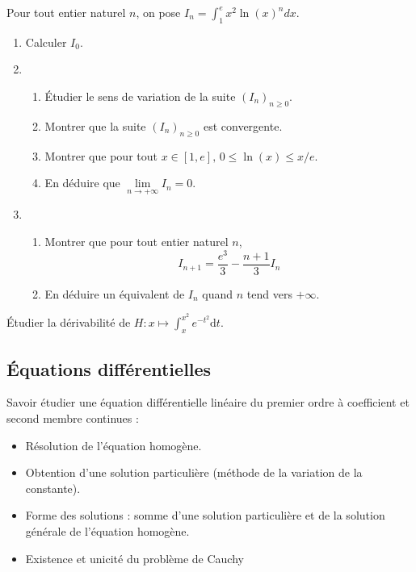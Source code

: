 \documentclass[a4paper,twoside,french,10pt]{VcCours}
\newcommand{\dt}{\text{d}t}
\begin{document}
\medskip

\begin{Exercice}{}\end{Exercice} Pour tout entier naturel $n$, on pose $I_{n}=\int_{1}^{e}x^{2}\ln \left( x\right) ^{n}dx$.

\begin{enumerate}
\item  Calculer $I_0$.

\item 
\begin{enumerate}
\item Étudier le sens de variation de la suite $(I_{n})_{n \geq 0}$.

\item  Montrer que la suite $(I_{n})_{n \geq 0}$ est convergente.

\item  Montrer que pour tout $x\in [1,e], \, 0 \leq \ln (x) \leq x/e$.

\item  En déduire que $\lim\limits_{n\rightarrow +\infty }I_{n}=0$.
\end{enumerate}

\item 
\begin{enumerate}
\item  Montrer que pour tout entier naturel $\displaystyle n$, 
$$I_{n+1}={
\frac{e^{3}}{3}}-{\frac{n+1}{3}}I_{n}$$

\item  En déduire un équivalent de $I_n$ quand $n$ tend vers $+ \infty$.

\end{enumerate}
\end{enumerate}

\begin{Exercice}{}\end{Exercice} Étudier la dérivabilité de $H : x \mapsto \int_x^{x^2} e^{-t^2} \dt$.


\subsection{Équations différentielles}

\begin{ptc}{}
	Savoir étudier une équation différentielle linéaire du premier ordre à coefficient et second membre continues :
\begin{itemize} 
\item Résolution de l'équation homogène.
\item Obtention d'une solution particulière (méthode de la variation de la constante).
\item Forme des solutions : somme d'une solution particulière et de la solution générale de l'équation homogène.
\item Existence et unicité du problème de Cauchy
\end{itemize}
\end{ptc}
\end{document}
